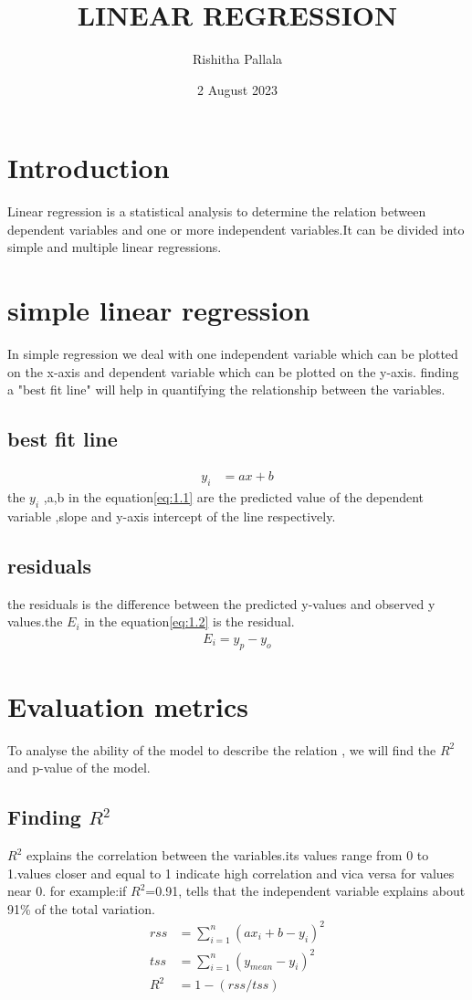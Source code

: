 \documentclass{article}
\title{LINEAR REGRESSION}
\author{Rishitha Pallala }
\date{2 August 2023}
\begin{document}
\maketitle

\section{Introduction}
\label{introduction}
Linear regression is a statistical analysis to determine the relation between dependent variables and one or more independent variables.It can be divided into simple and multiple linear regressions.


\section{simple linear regression}
In simple regression we deal with one independent variable which can be plotted on the x-axis and dependent variable which can be plotted on the y-axis. finding a "best fit line" will help in quantifying the relationship between the variables.


\subsection{best fit line}
\begin{align}
    y_i&= ax + b \label{eq:1.1} 
\end{align}
the $y_i$ ,a,b in the equation\eqref{eq:1.1} are the predicted value of the dependent variable ,slope and y-axis intercept of the line respectively.
\subsection{residuals}
the residuals is the difference between the predicted y-values and observed y values.the $E_i$ in the equation\eqref{eq:1.2} is the residual.
\begin{align}
    E_i=y_p-y_o\label{eq:1.2} 
\end{align} 

\section{Evaluation metrics}
To analyse the ability of the model to describe the relation , we will find the $R^2$ and p-value of the model.
\subsection{Finding $R^2$}
$R^2$ explains the correlation between the variables.its values range from 0 to 1.values closer and equal to 1 indicate high correlation and vica versa for values near 0. for example:if $R^2$=0.91, tells that the independent variable explains about 91\% of the total variation.
\begin{align} 
    rss&=\sum_{i=1}^{n}(ax_i+b-y_i)^2\label{eq:1.4}\\
    tss&=\sum_{i=1}^{n}(y_{mean}-y_i)^2\label{eq:1.5}\\
    R^2&=1-(rss/tss)\label{eq:1.3} \\
\end{align} 
\end{document}
